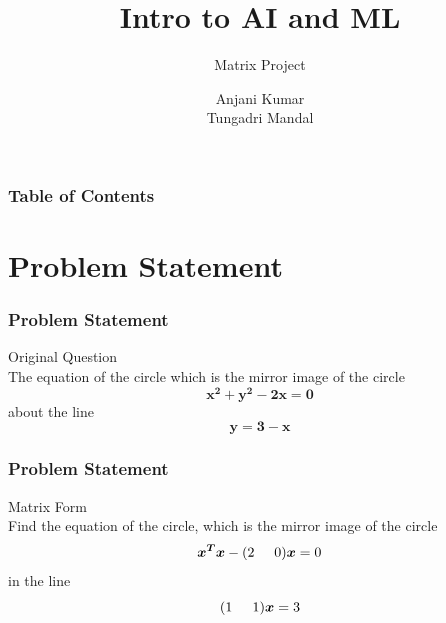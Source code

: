 \documentclass{beamer}
\title{Intro to AI and ML}
\subtitle{Matrix Project}
\author{Anjani Kumar\texorpdfstring{\\ Tungadri Mandal}{}}
\begin{document}
 

\frame{\titlepage}

\begin{frame}
\frametitle{Table of Contents}
\tableofcontents
\end{frame}

\section{Problem Statement}
\begin{frame}
\frametitle{Problem Statement }
Original Question\\
The equation of the circle which is the mirror image of the circle\\
\begin{equation}
    \boldsymbol{{x^2}+{y^2}-2x=0}
\end{equation}
about the line\\
\begin{equation}
    \boldsymbol{y=3-x}
\end{equation}
\end{frame}

\begin{frame}
\frametitle{Problem Statement }
Matrix Form\\
Find the equation of the circle, which is the
mirror image of the circle
\begin{equation}
    \boldsymbol{x^Tx} - (2\hspace{5mm} 0)\boldsymbol{x} = 0
\end{equation}
in the line 
\begin{equation}
    (1\hspace{5mm} 1)\boldsymbol{x} = 3
\end{equation}
\end{frame}
\end{document}
